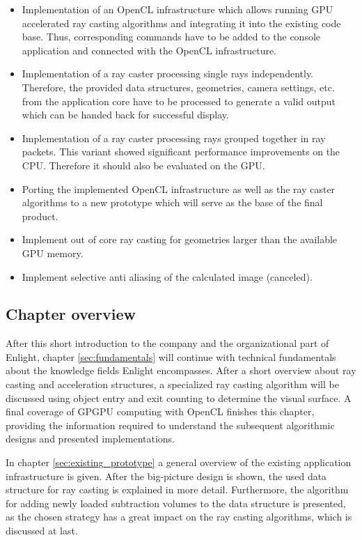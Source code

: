 \begin{itemize}
	\item Implementation of an OpenCL infrastructure which allows running GPU accelerated ray casting algorithms and integrating it into the existing code base. Thus, corresponding commands have to be added to the console application and connected with the OpenCL infrastructure.
	
	\item Implementation of a ray caster processing single rays independently. Therefore, the provided data structures, geometries, camera settings, etc. from the application core have to be processed to generate a valid output which can be handed back for successful display.
	
	\item Implementation of a ray caster processing rays grouped together in ray packets. This variant showed significant performance improvements on the CPU. Therefore it should also be evaluated on the GPU.
	
	\item Porting the implemented OpenCL infrastructure as well as the ray caster algorithms to a new prototype which will serve as the base of the final product.
	
	\item Implement out of core ray casting for geometries larger than the available GPU memory.
	
	\item Implement selective anti aliasing of the calculated image (canceled).
\end{itemize}


\subsection{Chapter overview}

After this short introduction to the company and the organizational part of Enlight,  chapter \ref{sec:fundamentals} will continue with technical fundamentals about the knowledge fields Enlight encompasses. After a short overview about ray casting and acceleration structures, a specialized ray casting algorithm will be discussed using object entry and exit counting to determine the visual surface. A final coverage of GPGPU computing with OpenCL finishes this chapter, providing the information required to understand the subsequent algorithmic designs and presented implementations.

In chapter \ref{sec:existing_prototype} a general overview of the existing application infrastructure is given. After the big-picture design is shown, the used data structure for ray casting is explained in more detail. Furthermore, the algorithm for adding newly loaded subtraction volumes to the data structure is presented, as the chosen strategy has a great impact on the ray casting algorithms, which is discussed at last.

